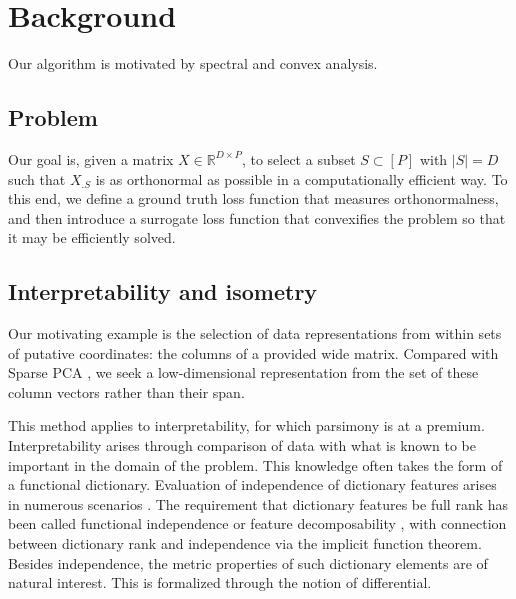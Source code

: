 \section{Background}

Our algorithm is motivated by spectral and convex analysis.

\subsection{Problem}

Our goal is, given a matrix $ X \in \mathbb R^{D \times P}$, to select a subset $ S \subset [P]$ with $| S| = D$ such that $X_{.  S}$ is as orthonormal as possible in a computationally efficient way.
To this end, we define a ground truth loss function that measures orthonormalness, and then introduce a surrogate loss function that convexifies the problem so that it may be efficiently solved.

\subsection{Interpretability and isometry}

Our motivating example is the selection of data representations from within sets of putative coordinates: the columns of a provided wide matrix.
Compared with Sparse PCA \citep{Dey2017-mx, Bertsimas2022-qo, Bertsimas2022-dv}, we seek a low-dimensional representation from the set of these column vectors rather than their span.

This method applies to interpretability, for which parsimony is at a premium.
Interpretability arises through comparison of data with what is known to be important in the domain of the problem.
This knowledge often takes the form of a functional dictionary.
Evaluation of independence of dictionary features arises in numerous scenarios \citep{Chen2019-km, Koelle2022-ju, He2023-ch}.
The requirement that dictionary features be full rank has been called functional independence \citep{Koelle2022-ju} or feature decomposability \citep{templeton2024scaling}, with connection between dictionary rank and independence via the implicit function theorem.
Besides independence, the metric properties of such dictionary elements are of natural interest.
This is formalized through the notion of differential.

